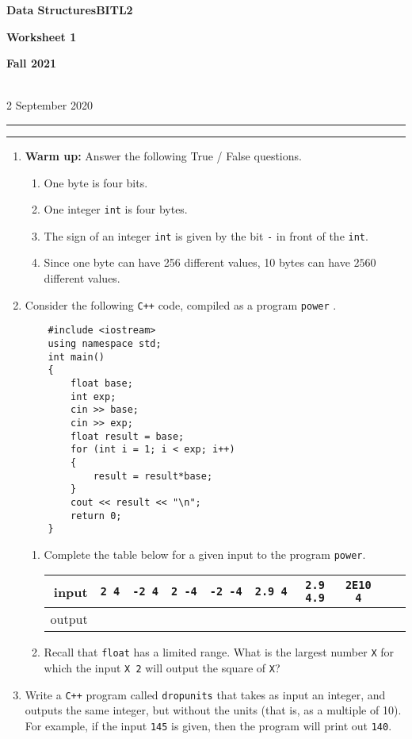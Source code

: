 \documentclass[a4paper,12pt]{article}
\begin{document}
\begin{center}
\parbox{3.5cm}{\flushleft\bf Data Structures\linebreak BITL2} \hfill {\bf\Huge Worksheet 1} \hfill \parbox{3.5cm}{\flushright\bf Fall 2021} \\[8pt]
\rm\small 2 September 2020
\end{center}

\hrule\vspace{2pt}\hrule

\begin{enumerate}

\item \textbf{Warm up:} Answer the following True / False questions.
\begin{enumerate}
\item One byte is four bits.
\item One integer \texttt{int} is four bytes.
\item The sign of an integer \texttt{int} is given by the bit \texttt{-} in front of the \texttt{int}.
\item Since one byte can have 256 different values, 10 bytes can have $2560$ different values.
\end{enumerate}

\item Consider the following \texttt{C++} code, compiled as a program \texttt{power} .
{\fontsize{9}{10}\selectfont
\begin{verbatim}
    #include <iostream>
    using namespace std;
    int main() 
    {
        float base;
        int exp;
        cin >> base;
        cin >> exp;
        float result = base;
        for (int i = 1; i < exp; i++)
        {
            result = result*base;
        }
        cout << result << "\n";
        return 0;
    }
\end{verbatim}
}
\begin{enumerate}
\item Complete the table below for a given input to the program \texttt{power}.
\begin{center}
\begin{tabular}{|r|c|c|c|c|c|c|c|c|c|}
\hline input & \texttt{2\ 4} & \texttt{-2\ 4} & \texttt{2\ -4} & \texttt{-2\ -4} & \texttt{2.9\ 4} & \texttt{2.9 4.9} & \texttt{2E10 4}\\
\hline output &&&&& \\
\hline
\end{tabular}
\end{center}

\item Recall that \texttt{float} has a limited range. What is the largest number \texttt{X} for which the input \texttt{X 2} will output the square of \texttt{X}?
\end{enumerate}

\item Write a \texttt{C++} program called \texttt{dropunits} that takes as input an integer, and outputs the same integer, but without the units (that is, as a multiple of 10). For example, if the input \texttt{145} is given, then the program will print out \texttt{140}.

\end{enumerate}

\end{document}
